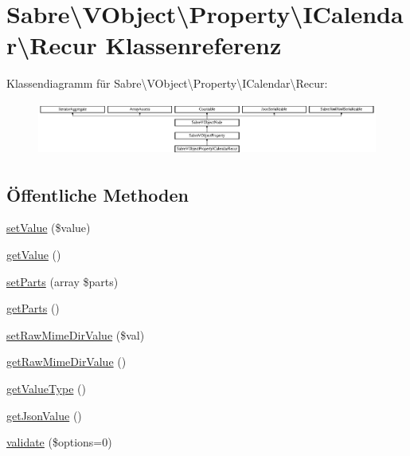 \hypertarget{class_sabre_1_1_v_object_1_1_property_1_1_i_calendar_1_1_recur}{}\section{Sabre\textbackslash{}V\+Object\textbackslash{}Property\textbackslash{}I\+Calendar\textbackslash{}Recur Klassenreferenz}
\label{class_sabre_1_1_v_object_1_1_property_1_1_i_calendar_1_1_recur}
Klassendiagramm für Sabre\textbackslash{}V\+Object\textbackslash{}Property\textbackslash{}I\+Calendar\textbackslash{}Recur\+:\begin{figure}[H]
\begin{center}
\leavevmode
\includegraphics[height=1.763780cm]{class_sabre_1_1_v_object_1_1_property_1_1_i_calendar_1_1_recur}
\end{center}
\end{figure}
\subsection*{Öffentliche Methoden}
\begin{DoxyCompactItemize}
\item 
\mbox{\hyperlink{class_sabre_1_1_v_object_1_1_property_1_1_i_calendar_1_1_recur_aeb38d866a8683944b89d7cebecf415d0}{set\+Value}} (\$value)
\item 
\mbox{\hyperlink{class_sabre_1_1_v_object_1_1_property_1_1_i_calendar_1_1_recur_a4d3130e86da49d213e75ea33d1571005}{get\+Value}} ()
\item 
\mbox{\hyperlink{class_sabre_1_1_v_object_1_1_property_1_1_i_calendar_1_1_recur_ab33745d40e4c1b5153eae6a844420871}{set\+Parts}} (array \$parts)
\item 
\mbox{\hyperlink{class_sabre_1_1_v_object_1_1_property_1_1_i_calendar_1_1_recur_a7aedf8fafb5fc64bc186ae3dca2c6aab}{get\+Parts}} ()
\item 
\mbox{\hyperlink{class_sabre_1_1_v_object_1_1_property_1_1_i_calendar_1_1_recur_ad414e79b0a13508d845b80bf44cca6f3}{set\+Raw\+Mime\+Dir\+Value}} (\$val)
\item 
\mbox{\hyperlink{class_sabre_1_1_v_object_1_1_property_1_1_i_calendar_1_1_recur_ae33183f73b95322092e4684defb4a2bf}{get\+Raw\+Mime\+Dir\+Value}} ()
\item 
\mbox{\hyperlink{class_sabre_1_1_v_object_1_1_property_1_1_i_calendar_1_1_recur_a1bbe19da553096871b53a99c9330e478}{get\+Value\+Type}} ()
\item 
\mbox{\hyperlink{class_sabre_1_1_v_object_1_1_property_1_1_i_calendar_1_1_recur_af53d7418ed334018f7f7be66260f87b2}{get\+Json\+Value}} ()
\item 
\mbox{\hyperlink{class_sabre_1_1_v_object_1_1_property_1_1_i_calendar_1_1_recur_a1377db71a3630a3854557613af241c9a}{validate}} (\$options=0)
\end{DoxyCompactItemize}
